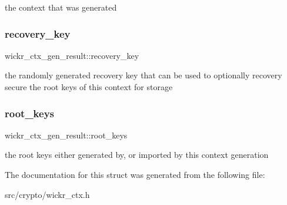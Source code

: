 the context that was generated \mbox{\label{structwickr__ctx__gen__result_a32feaf76def6c13abe0240c6ae669999}} 
\subsubsection{\texorpdfstring{recovery\+\_\+key}{recovery\_key}}
{\footnotesize\ttfamily wickr\+\_\+ctx\+\_\+gen\+\_\+result\+::recovery\+\_\+key}

the randomly generated recovery key that can be used to optionally recovery secure the root keys of this context for storage \mbox{\label{structwickr__ctx__gen__result_a42600241a65a968de4f84120d9031320}} 
\subsubsection{\texorpdfstring{root\+\_\+keys}{root\_keys}}
{\footnotesize\ttfamily wickr\+\_\+ctx\+\_\+gen\+\_\+result\+::root\+\_\+keys}

the root keys either generated by, or imported by this context generation 

The documentation for this struct was generated from the following file\+:\begin{DoxyCompactItemize}
\item 
src/crypto/wickr\+\_\+ctx.\+h\end{DoxyCompactItemize}
